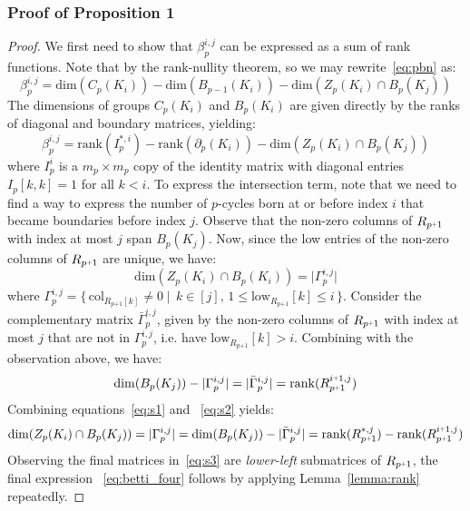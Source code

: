 \documentclass[10pt]{article}
\newcommand{\+}{%
	\raisebox{0.18ex}{\scaleobj{0.55}{+}}
}
\begin{document}
\subsubsection*{Proof of Proposition 1}
\begin{proof}
We first need to show that $\beta_p^{i,j}$ can be expressed as a sum of rank functions. Note that by the rank-nullity theorem, so we may rewrite~\eqref{eq:pbn} as:
$$ \beta_p^{i,j} = \mathrm{dim} \left( C_p(K_i) \right) - \mathrm{dim} \left( B_{p-1}(K_i) \right) - \mathrm{dim}\left( Z_p(K_i) \cap B_p(K_j) \right ) $$
The dimensions of groups $C_p(K_i)$ and $B_p(K_i)$ are given directly by the ranks of diagonal and boundary matrices, yielding:  
$$
	\beta_p^{i,j} = \mathrm{rank}(I_p^{\ast, i}) - \mathrm{rank}(\partial_p(K_i)) - \mathrm{dim}\left( Z_p(K_i) \cap B_p(K_j) \right )
$$
where $I_p^i$ is a $m_p \times m_p$ copy of the identity matrix with diagonal entries $I_p[k,k] = 1$ for all $k < i$. 
To express the intersection term, note that we need to find a way to express the number of $p$-cycles born at or before index $i$ that became boundaries before index $j$. 
Observe that the non-zero columns of $R_{p \+ 1}$ with index at most $j$ span $B_p(K_j)$. Now, since the low entries of the non-zero columns of $R_{p \+ 1}$ are unique, we have:
\begin{equation}\label{eq:s1}
	\mathrm{dim}(Z_p(K_i) \cap B_p(K_i)) = \lvert \Gamma_p^{i,j} \rvert
\end{equation}
where $\Gamma_p^{i,j}  = \{ \, \mathrm{col}_{R_{p\texttt{+}1}[k] } \neq 0 \mid \, k \in [j], \, 1 \leq \mathrm{low}_{R_{p\texttt{+}1}}[k] \leq i \,\}$. Consider the complementary matrix $\bar{\Gamma}_p^{i,j}$, given by the non-zero columns of $R_{p \+ 1}$ with index at most $j$ that are not in $\Gamma_p^{i,j}$, i.e. have $\mathrm{low}_{R_{p\texttt{+}1}}[k] > i$. Combining with the observation above, we have: 
\begin{equation}\label{eq:s2}
	\mathrm{dim}(B_p(K_j)) - \lvert \Gamma_p^{i,j} \rvert = \lvert \bar{\Gamma}_p^{i,j} \rvert = \mathrm{rank}(R_{p\+1}^{i\+1,j})
\end{equation}
Combining equations~\eqref{eq:s1} and ~\eqref{eq:s2} yields:
\begin{equation}\label{eq:s3}
	\mathrm{dim}(Z_p(K_i) \cap B_p(K_j))  = \lvert \Gamma_p^{i,j}  \rvert 
	= \mathrm{dim}(B_p(K_j)) -  \lvert \bar{\Gamma}_p^{i,j}  \rvert 
	= \mathrm{rank}(R_{p\+1}^{\ast, j}) - \mathrm{rank}(R_{p\+1}^{i\+1,j})
\end{equation}
Observing the final matrices in~\eqref{eq:s3} are \emph{lower-left} submatrices of $R_{p\+1}$, the final expression ~\eqref{eq:betti_four} follows by applying Lemma~\ref{lemma:rank} repeatedly. 
\end{proof}
\end{document}
